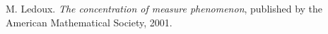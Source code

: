\documentclass[11pt]{article}
\title{}			%
\author{Patrick Hayes}				%
\date{}					%
\theoremstyle{definition}
\begin{document}
\maketitle

\begin{thebibliography}{99}

 M. Ledoux.
{\em The concentration of measure phenomenon}, published by 
the American Mathematical Society, 2001.

\end{thebibliography}
\end{document}
